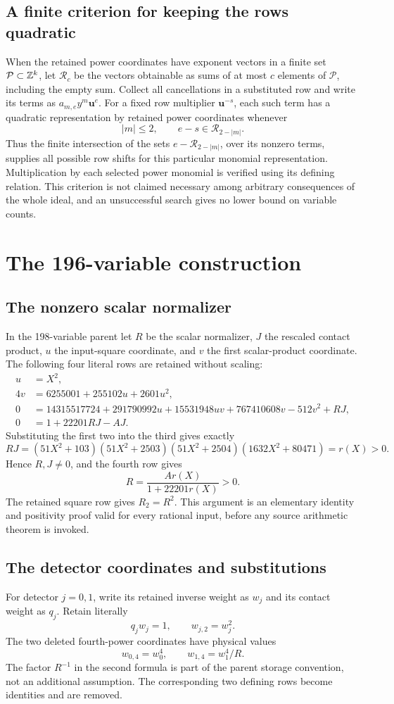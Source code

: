\documentclass[11pt,a4paper]{article}
\begin{document}
\subsection{A finite criterion for keeping the rows quadratic}
When the retained power coordinates have exponent vectors in a finite set
$\mathcal P\subset\mathbb Z^k$, let $\mathcal R_c$ be the vectors obtainable as
sums of at most $c$ elements of $\mathcal P$, including the empty sum.
Collect all cancellations in a substituted row and write its terms as
$a_{m,e}y^m\boldsymbol u^e$. For a fixed row multiplier
$\boldsymbol u^{-s}$, each such term has a quadratic representation by
retained power coordinates whenever
\[
 |m|\le2,\qquad e-s\in\mathcal R_{2-|m|}.
\]
Thus the finite intersection of the sets $e-\mathcal R_{2-|m|}$, over its
nonzero terms, supplies all possible row shifts for this particular
monomial representation. Multiplication by each selected power monomial
is verified using its defining relation. This criterion is not claimed
necessary among arbitrary consequences of the whole ideal, and an
unsuccessful search gives no lower bound on variable counts.

\section{The 196-variable construction}
\subsection{The nonzero scalar normalizer}
In the 198-variable parent let $R$ be the scalar normalizer, $J$ the
rescaled contact product, $u$ the input-square coordinate, and $v$ the
first scalar-product coordinate. The following four literal rows are
retained without scaling:
\begin{align*}
 u&=X^2,\\
 4v&=6255001+255102u+2601u^2,\\
 0&=14315517724+291790992u+15531948uv+767410608v-512v^2+RJ,\\
 0&=1+22201RJ-AJ.
\end{align*}
Substituting the first two into the third gives exactly
\[
 RJ=(51X^2+103)(51X^2+2503)(51X^2+2504)(1632X^2+80471)=r(X)>0.
\]
Hence $R,J\ne0$, and the fourth row gives
\[
 R=\frac{Ar(X)}{1+22201r(X)}>0.
\]
The retained square row gives $R_2=R^2$. This argument is an elementary
identity and positivity proof valid for every rational input, before
any source arithmetic theorem is invoked.

\subsection{The detector coordinates and substitutions}
For detector $j=0,1$, write its retained inverse weight as $w_j$ and its
contact weight as $q_j$. Retain literally
\[
 q_jw_j=1,\qquad w_{j,2}=w_j^2.
\]
The two deleted fourth-power coordinates have physical values
\[
 w_{0,4}=w_0^4,\qquad w_{1,4}=w_1^4/R.
\]
The factor $R^{-1}$ in the second formula is part of the parent storage
convention, not an additional assumption. The corresponding two defining
rows become identities and are removed.
\end{document}
